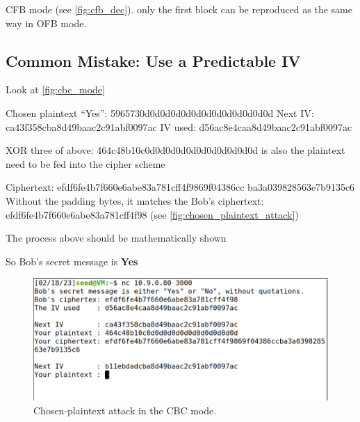 CFB mode (see \autoref{fig:cfb_dec}).
only the first block can be reproduced as the same way in OFB mode.

\subsection{Common Mistake: Use a Predictable IV}
%
Look at \autoref{fig:cbc_mode}

Chosen plaintext ``Yes'': {\selectfont 5965730d0d0d0d0d0d0d0d0d0d0d0d0d}
Next IV: {\selectfont ca43f358cba8d49baac2c91abf0097ac}
IV used: {\selectfont d56ac8e4caa8d49baac2c91abf0097ac}

XOR three of above: {\selectfont 464c48b10c0d0d0d0d0d0d0d0d0d0d0d}
is also the plaintext need to be fed into the cipher scheme

Ciphertext: {\selectfont efdf6fe4b7f660e6abe83a781cff4f9869f04386cc
ba3a039828563e7b9135c6}
Without the padding bytes, it matches the Bob's ciphertext: {\selectfont
efdf6fe4b7f660e6abe83a781cff4f98} (see \autoref{fig:chosen_plaintext_attack})

The process above should be mathematically shown

So Bob's secret message is \textbf{Yes}

\begin{figure}
    \centering
    \includegraphics[height=\textheight,width=\textwidth,keepaspectratio]
    {figures/task6_yes.png}
    \caption{Chosen-plaintext attack in the CBC mode.}\label{fig:chosen_plaintext_attack}
\end{figure}